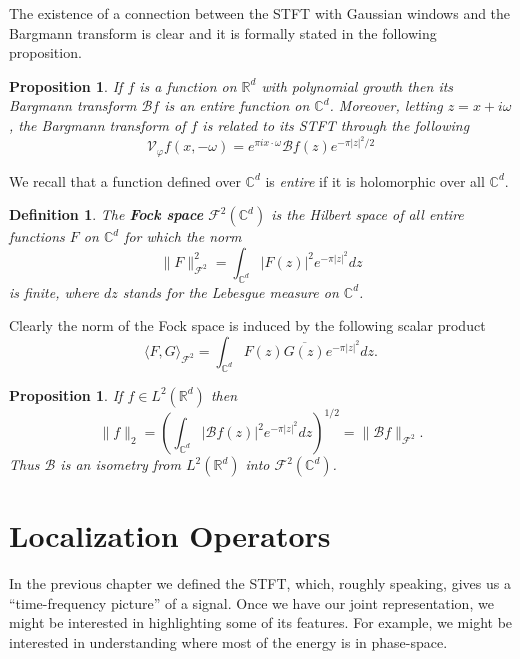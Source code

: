 \documentclass[corpo=11pt, stile=classica, tipotesi=custom,
greek, evenboxes, english]{toptesi}
\numberwithin{equation}{chapter}
\newtheorem{defi}[teo]{Definition}
\newtheorem{prop}[teo]{Proposition}
\theoremstyle{definition}
\theoremstyle{remark}
\newcommand{\R}{\mathbb{R}} %
\newcommand{\V}{\mathcal{V}} %
\newcommand{\Fock}{\mathcal{F}} %
\newcommand{\C}{\mathbb{C}} %
\newcommand{\Barg}{\mathcal{B}} %
\begin{document}
The existence of a connection between the STFT with Gaussian windows and the Bargmann transform is clear and it is formally stated in the following proposition.
\begin{prop}\label{connection between Bargmann tranform and STFT proposition}
	If $f$ is a function on $\R^d$ with polynomial growth then its Bargmann transform $\Barg f$ is an entire function on $\C^d$. Moreover, letting $z = x + i\omega$, the Bargmann transform of $f$ is related to its STFT through the following
	\begin{equation}\label{connection between Bargmann transform and STFT}
		\V_{\varphi} f(x,-\omega) = e^{\pi i x \cdot \omega} \Barg f(z) e^{-\pi |z|^2/2}
	\end{equation}
\end{prop}
We recall that a function defined over $\C^d$ is \emph{entire} if it is holomorphic over all $\C^d$.
\begin{defi}\label{Fock space}
	The \textbf{Fock space} $\Fock^2(\C^d)$ is the Hilbert space of all entire functions $F$ on $\C^d$ for which the norm
	\begin{equation}\label{Fock space norm}
		\|F\|^2_{\Fock^2} = \int_{\C^d} |F(z)|^2 e^{-\pi |z|^2}dz
	\end{equation}
	is finite, where $dz$ stands for the Lebesgue measure on $\C^d$.
\end{defi}
Clearly the norm of the Fock space is induced by the following scalar product
\begin{equation}\label{Fock space scalar product}
	\langle F,G \rangle_{\Fock^2} = \int_{\C^d} F(z) \overline{G(z)} e^{-\pi |z|^2}dz.
\end{equation}

\begin{prop}\label{Bargmann transform is an isometry}
	If $f \in L^2(\R^d)$ then
	\begin{equation}
		\|f\|_2 = \left(\int_{\C^d} |\Barg f(z)|^2 e^{-\pi |z|^2}dz\right)^{1/2} = \|\Barg f\|_{\Fock^2}.
	\end{equation}
	Thus $\Barg$ is an isometry from $L^2(\R^d)$ into $\Fock^2(\C^d)$.
\end{prop}

\chapter{Localization Operators}\label{chapter localization operators}
In the previous chapter we defined the STFT, which, roughly speaking, gives us a ``time-frequency picture'' of a signal. Once we have our joint representation, we might be interested in highlighting some of its features. For example, we might be interested in understanding where most of the energy is in phase-space.
\end{document}
